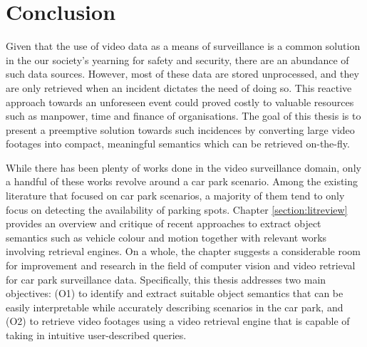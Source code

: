 
\chapter{Conclusion}
\label{section:conclusion}

Given that the use of video data as a means of surveillance is a common solution in the our society's yearning for safety and security, there are an abundance of such data sources. However, most of these data are stored unprocessed, and they are only retrieved when an incident dictates the need of doing so. This reactive approach towards an unforeseen event could proved costly to valuable resources such as manpower, time and finance of organisations. The goal of this thesis is to present a preemptive solution towards such incidences by converting large video footages into compact, meaningful semantics which can be retrieved on-the-fly. 

While there has been plenty of works done in the video surveillance domain, only a handful of these works revolve around a car park scenario. Among the existing literature that focused on car park scenarios, a majority of them tend to only focus on detecting the availability of parking spots.
Chapter \ref{section:litreview} provides an overview and critique of recent approaches to extract object semantics such as vehicle colour and motion together with relevant works involving retrieval engines. On a whole, the chapter suggests a considerable room for improvement and research in the field of computer vision and video retrieval for car park surveillance data.
Specifically, this thesis addresses two main objectives: (O1) to identify and extract suitable object semantics that can be easily interpretable while accurately describing scenarios in the car park, and (O2) to retrieve video footages using a video retrieval engine that is capable of taking in intuitive user-described queries. 

